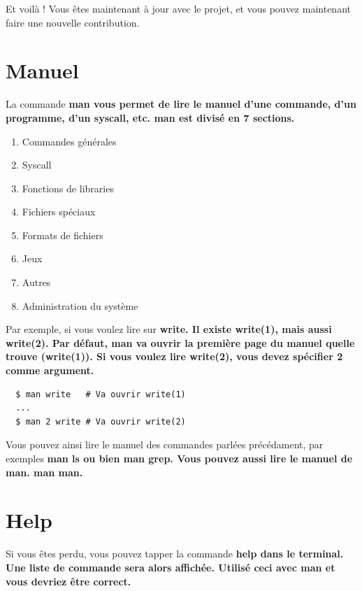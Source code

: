 \documentclass[12pt,oneside,final]{article}
\begin{document}
Et voilà ! Vous êtes maintenant à jour avec le projet, et vous pouvez maintenant faire une nouvelle contribution.

\newpage
\section{Manuel}
La commande \bf{man} vous permet de lire le manuel d'une commande,
d'un programme, d'un syscall, etc. \bf{man} est divisé en 7 sections.

\begin{enumerate}[1]
\item Commandes générales
\item Syscall
\item Fonctions de libraries
\item Fichiers spéciaux
\item Formats de fichiers
\item Jeux
\item Autres
\item Administration du système
\end{enumerate}

Par exemple, si vous voulez lire sur \bf{write}. Il existe
\bf{write(1)}, mais aussi \bf{write(2)}. Par défaut, \bf{man} va
ouvrir la première page du manuel quelle trouve (\bf{write(1)}). Si
vous voulez lire \bf{write(2)}, vous devez spécifier 2 comme argument.

\begin{verbatim}
  $ man write   # Va ouvrir write(1)
  ...
  $ man 2 write # Va ouvrir write(2)
\end{verbatim}

Vous pouvez ainsi lire le manuel des commandes parlées précédament,
par exemples \bf{man ls} ou bien \bf{man grep}. Vous pouvez aussi lire
le manuel de \bf{man}. \bf{man man}.


\section{Help}
Si vous êtes perdu, vous pouvez tapper la commande \bf{help} dans le
terminal. Une liste de commande sera alors affichée. Utilisé ceci avec
\bf{man} et vous devriez être correct.
\end{document}
